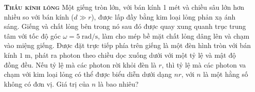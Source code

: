 \begin{problem}
{\textbf{\textsc{Thấu kính lỏng}}} Một giếng tròn lớn, với bán kính 1 mét và chiều sâu lớn hơn nhiều so với bán kính ($d \gg r$), được lấp đầy bằng kim loại lỏng phản xạ ánh sáng. Giếng và chất lỏng bên trong nó sau đó được quay xung quanh trục trung tâm với tốc độ góc $\omega = 5\;\mathrm{rad/s}$, làm cho mép bề mặt chất lỏng dâng lên và chạm vào miệng giếng. Được đặt trực tiếp phía trên giếng là một đèn hình tròn với bán kính $1\;\mathrm{m}$, phát ra photon theo chiều dọc xuống dưới với một tỷ lệ và mật độ đồng đều. Nếu tỷ lệ mà các photon rời khỏi đèn là $r$, thì tỷ lệ mà các photon va chạm với kim loại lỏng có thể được biểu diễn dưới dạng $nr$, với $n$ là một hằng số không có đơn vị. Giá trị của $n$ là bao nhiêu?

\end{problem}
